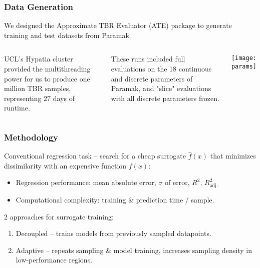 \begin{frame}
	\frametitle{Data Generation}
	We designed the Approximate TBR Evaluator (ATE) package to generate training and test datasets from Paramak.\newline
	 \begin{columns}[onlytextwidth,T]
      \column{\dimexpr\linewidth-6cm-5mm}
        
        UCL's Hypatia cluster provided the multithreading power for us to produce one million TBR samples, representing 27 days of runtime.\newline
        
        These runs included full evaluations on the 18 continuous and discrete parameters of Paramak, and "slice" evaluations with all discrete parameters frozen.

      \column{6cm}
      \vspace{0cm}
      \texttt{[image: params]}

    \end{columns}
\end{frame}


\begin{frame}
	\frametitle{Methodology}
		Conventional regression task -- search for a cheap surrogate $\hat{f}(x)$ that
		minimizes dissimilarity with an expensive function $f(x)$:

		\begin{itemize}
			\item
				Regression performance: mean absolute error, $\sigma$ of
				error, $R^2$, $R^2_\text{adj.}$
			\item
				Computational complexity:
				training \& prediction time / sample.
		\end{itemize}

		\vspace{2em}

		2 approaches for surrogate training:
		\begin{enumerate}
			\item
				Decoupled -- trains models from previously sampled
				datapoints.
			\item
				Adaptive -- repeats sampling \& model training, increases
				sampling density in low-performance regions.
		\end{enumerate}
\end{frame}

